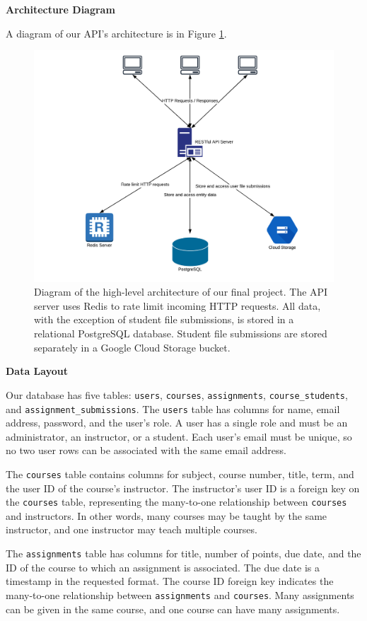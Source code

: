 \documentclass[11pt]{article}
\begin{document}
\noindent
{\huge\textbf{Architecture Diagram}}\bigskip

A diagram of our API's architecture is in Figure \ref{fig:architecture}.

\begin{figure}[H]
  \centering
  \includegraphics[width=.70\linewidth]{./architecture.pdf}
  \caption{Diagram of the high-level architecture of our final project. The API server uses Redis to rate limit incoming HTTP requests. All data, with the exception of student file submissions, is stored in a relational PostgreSQL database. Student file submissions are stored separately in a Google Cloud Storage bucket.}
  \label{fig:architecture}
\end{figure}

\bigskip
\bigskip

\noindent
{\huge\textbf{Data Layout}}\bigskip

Our database has five tables: \texttt{users}, \texttt{courses}, \texttt{assignments}, \texttt{course\_students}, and \texttt{assignment\_submissions}. The \texttt{users} table has columns for name, email address, password, and the user's role. A user has a single role and must be an administrator, an instructor, or a student. Each user's email must be unique, so no two user rows can be associated with the same email address.

The \texttt{courses} table contains columns for subject, course number, title, term, and the user ID of the course's instructor. The instructor's user ID is a foreign key on the \texttt{courses} table, representing the many-to-one relationship between \texttt{courses} and instructors. In other words, many courses may be taught by the same instructor, and one instructor may teach multiple courses.

The \texttt{assignments} table has columns for title, number of points, due date, and the ID of the course to which an assignment is associated. The due date is a timestamp in the requested format. The course ID foreign key indicates the many-to-one relationship between \texttt{assignments} and \texttt{courses}. Many assignments can be given in the same course, and one course can have many assignments.
\end{document}

